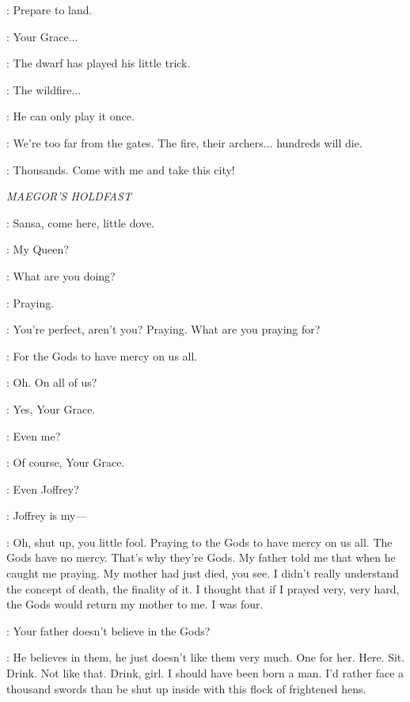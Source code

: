 \STANNIS: Prepare to land. 

\CAPTAIN: Your Grace$\ldots$ 

\STANNIS: The dwarf has played his little trick. 

\CAPTAIN: The wildfire$\ldots$  

\STANNIS: He can only play it once. 

\CAPTAIN: We're too far from the gates. The fire, their archers$\ldots$ hundreds will die. 

\STANNIS: Thousands.  Come with me and take this city! 



\scene

\textit{MAEGOR'S HOLDFAST}


\CERSEI: Sansa, come here, little dove. 

\SANSA:  My Queen?

\CERSEI: What are you doing? 

\SANSA: Praying. 

\CERSEI: You're perfect, aren't you? Praying. What are you praying for? 

\SANSA: For the Gods to have mercy on us all. 

\CERSEI: Oh. On all of us? 

\SANSA: Yes, Your Grace. 

\CERSEI: Even me? 

\SANSA: Of course, Your Grace. 

\CERSEI: Even Joffrey? 

\SANSA: Joffrey is my--- 

\CERSEI: Oh, shut up, you little fool. Praying to the Gods to have mercy on us all. The Gods have no mercy. That's why they're Gods. My father told me that when he caught me praying. My mother had just died, you see. I didn't really understand the concept of death, the finality of it. I thought that if I prayed very, very hard, the Gods would return my mother to me. I was four. 

\SANSA: Your father doesn't believe in the Gods? 

\CERSEI: He believes in them, he just doesn't like them very much.  One for her.  Here.  Sit. Drink.  Not like that. Drink, girl.  I should have been born a man. I'd rather face a thousand swords than be shut up inside with this flock of frightened hens. 

